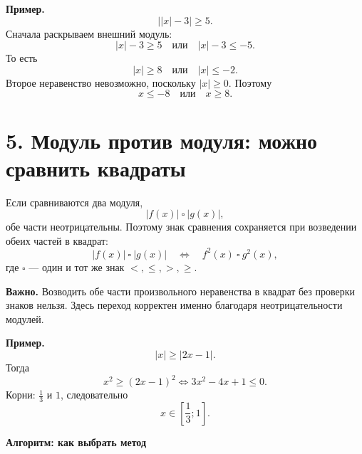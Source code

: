 \documentclass[a4paper,12pt]{article}
\newcommand{\sectionline}{\par\vspace{0.25em}{\color{accent}\hrule height 0.7pt}\vspace{0.7em}}
\begin{document}
\textbf{Пример.}
\[
 \bigl||x|-3\bigr|\ge5.
\]
Сначала раскрываем внешний модуль:
\[
 |x|-3\ge5\quad\text{или}\quad |x|-3\le-5.
\]
То есть
\[
 |x|\ge8\quad\text{или}\quad |x|\le-2.
\]
Второе неравенство невозможно, поскольку $|x|\ge0$. Поэтому
\[
 x\le-8\quad\text{или}\quad x\ge8.
\]

\section*{5. Модуль против модуля: можно сравнить квадраты}
\sectionline
Если сравниваются два модуля,
\[
 |f(x)|\ \square\ |g(x)|,
\]
обе части неотрицательны. Поэтому знак сравнения сохраняется при возведении обеих частей в квадрат:
\[
 |f(x)|\ \square\ |g(x)|
 \quad\Longleftrightarrow\quad
 f^2(x)\ \square\ g^2(x),
\]
где $\square$ --- один и тот же знак $<,\le,>,\ge$.

\textbf{Важно.} Возводить обе части произвольного неравенства в квадрат без проверки знаков нельзя. Здесь переход корректен именно благодаря неотрицательности модулей.

\textbf{Пример.}
\[
 |x|\ge|2x-1|.
\]
Тогда
\[
 x^2\ge(2x-1)^2
 \Longleftrightarrow
 3x^2-4x+1\le0.
\]
Корни: $\frac13$ и $1$, следовательно
\[
 x\in\left[\frac13;1\right].
\]

\clearpage
\thispagestyle{fancy}
\begin{center}
{\Large\bfseries\color{darkaccent}Алгоритм: как выбрать метод}
\end{center}
\vspace{5mm}
\end{document}
